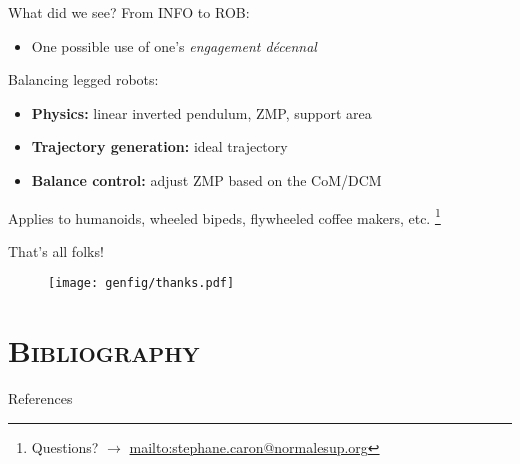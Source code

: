 \documentclass[9pt, aspectratio=43]{beamer}
\newcommand\blfootnote[1]{%
  \begingroup
  \renewcommand\thefootnote{}%
  \footnote{#1}%
  \addtocounter{footnote}{-1}%
  \endgroup
}
\begin{document}

\begin{frame}{What did we see?}
    From INFO to ROB:
    \begin{itemize}
        \item One possible use of one's \emph{engagement d\'{e}cennal}
    \end{itemize}
    Balancing legged robots:
    \begin{itemize}
        \item \textbf{Physics:} linear inverted pendulum, ZMP, support area
        \item \textbf{Trajectory generation:} ideal trajectory
        \item \textbf{Balance control:} adjust ZMP based on the CoM/DCM
    \end{itemize}
    Applies to humanoids, wheeled bipeds, flywheeled coffee makers, etc.
    \blfootnote{
        Questions? $\to$ \url{mailto:stephane.caron@normalesup.org}
    }
\end{frame}

\begin{frame}{That's all folks!}
    \vspace{2em}
    \begin{figure}
        \centering
        \texttt{[image: genfig/thanks.pdf]}
    \end{figure}
\end{frame}


\section*{\textsc{Bibliography}}


\renewcommand*{\bibfont}{\footnotesize}

\begin{frame}[allowframebreaks]{References}
    \printbibliography[heading=none]
\end{frame}

\end{document}
